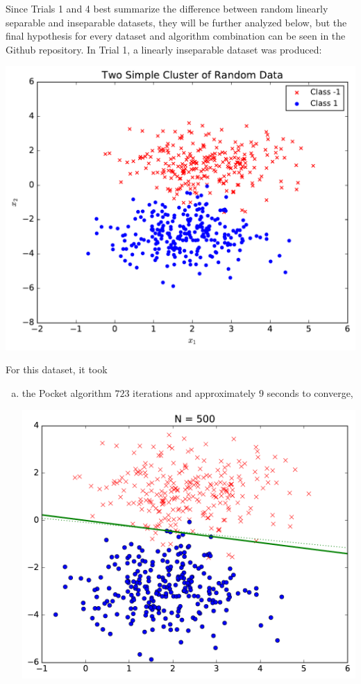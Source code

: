 \documentclass[a4paper]{article}
\begin{document}
\begin {description}
\begin{doublespace}
\newpage
Since Trials 1 and 4 best summarize the difference between random linearly separable and inseparable datasets, they will be further analyzed below, but the final hypothesis for every dataset and algorithm combination can be seen in the Github repository. In Trial 1, a linearly inseparable dataset was produced:
\begin{center}
\includegraphics[scale=0.65]{Trial_1/hw3_plot.pdf}
\end{center}
For this dataset, it took
\begin{enumerate}[(a)]
\item the Pocket algorithm $723$ iterations and approximately $9$ seconds to converge,
\begin{center}
\includegraphics[scale=0.5]{Trial_1/pocket_learning.pdf}

\end{center}
\end{enumerate}
\end{doublespace}
\end{description}
\end{document}
